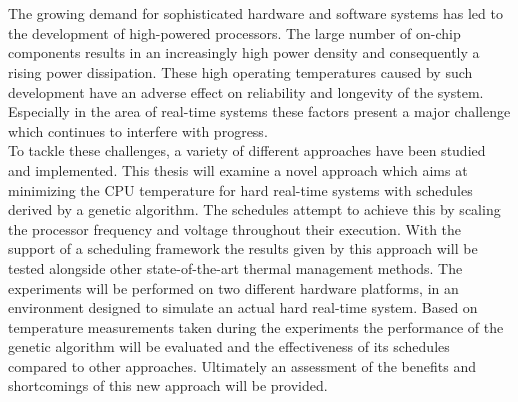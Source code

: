 \afterpage{\blankpage}
\chapter{\abstractname}

The growing demand for sophisticated hardware and software systems has led to the development of high-powered processors. The large number of on-chip components results in an increasingly high power density and consequently a rising power dissipation. These high operating temperatures caused by such development have an adverse effect on reliability and longevity of the system. Especially in the area of real-time systems these factors present a major challenge which continues to interfere with progress.\\
\hspace*{0.5ex}\hspace{0.5ex} To tackle these challenges, a variety of different approaches have been studied and implemented. This thesis will examine a novel approach which aims at minimizing the CPU temperature for hard real-time systems with schedules derived by a genetic algorithm. The schedules attempt to achieve this by scaling the processor frequency and voltage throughout their execution. With the support of a scheduling framework the results given by this approach will be tested alongside other state-of-the-art thermal management methods. The experiments will be performed on two different hardware platforms, in an environment designed to simulate an actual hard real-time system. Based on temperature measurements taken during the experiments the performance of the genetic algorithm will be evaluated and the effectiveness of its schedules compared to other approaches. Ultimately an assessment of the benefits and shortcomings of this new approach will be provided.
\leavevmode\thispagestyle{empty}\newpage